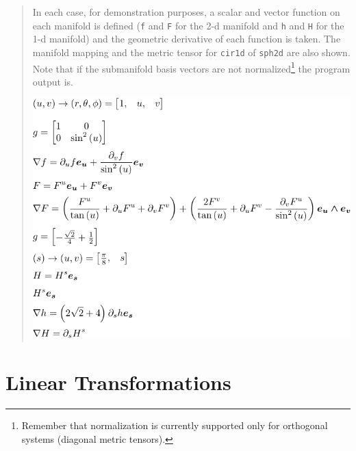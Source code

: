 \documentclass[12pt]{report}
\newcommand{\T}[1]{\texttt{#1}}
\begin{document}
\begin{quote}
    In each case, for demonstration purposes, a scalar and vector function on each manifold is defined (\T{f} and \T{F}
    for the 2-d manifold and \T{h} and \T{H} for the 1-d manifold) and the geometric derivative of each function is taken.  The
    manifold mapping and the metric tensor for \T{cir1d} of \T{sph2d} are also shown. Note that if the submanifold basis vectors
    are not normalized\footnote{Remember that normalization is currently supported only for orthogonal systems (diagonal
    metric tensors).} the program output is.
    \begin{center}
    \includegraphics[scale=1]{python/submanifold1.pdf}
    \end{center}
\end{quote}

\section{Linear Transformations}
\end{document}
